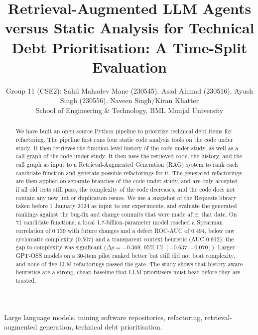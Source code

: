 \documentclass[12pt,onecolumn,draftclsnofoot]{IEEEtran}
\begin{document}
\title{Retrieval-Augmented LLM Agents versus Static Analysis for Technical Debt Prioritisation: A Time-Split Evaluation}

\author{Group 11 (CSE2): Sahil Mahadev Mane (230545), Asad Ahmad (230516), Ayush Singh (230556), Naveen Singh/Kiran Khatter\\
School of Engineering \& Technology, BML Munjal University}

\maketitle

\begin{abstract}
We have built an open source Python pipeline to prioritize technical debt items for refactoring. The pipeline first runs four static code analysis tools on the code under study. It then retrieves the function-level history of the code under study, as well as a call graph of the code under study. It then uses the retrieved code, the history, and the call graph as input to a Retrieval-Augmented Generation (RAG) system to rank each candidate function and generate possible refactorings for it. The generated refactorings are then applied on separate branches of the code under study, and are only accepted if all old tests still pass, the complexity of the code decreases, and the code does not contain any new lint or duplication issues. We use a snapshot of the Requests library taken before 1 January 2024 as input to our experiments, and evaluate the generated rankings against the bug-fix and change commits that were made after that date. On 71 candidate functions, a local 1.7-billion-parameter model reached a Spearman correlation of 0.139 with future changes and a defect ROC-AUC of 0.494, below raw cyclomatic complexity (0.507) and a transparent context heuristic (AUC 0.912); the gap to complexity was significant ($\Delta\rho=-0.369$, 95\% CI $[-0.637,-0.070]$). Larger GPT-OSS models on a 30-item pilot ranked better but still did not beat complexity, and none of five LLM refactorings passed the gate. The study shows that history-aware heuristics are a strong, cheap baseline that LLM prioritisers must beat before they are trusted.
\end{abstract}

\begin{IEEEkeywords}
Large language models, mining software repositories, refactoring, retrieval-augmented generation, technical debt prioritisation.
\end{IEEEkeywords}
\end{document}
